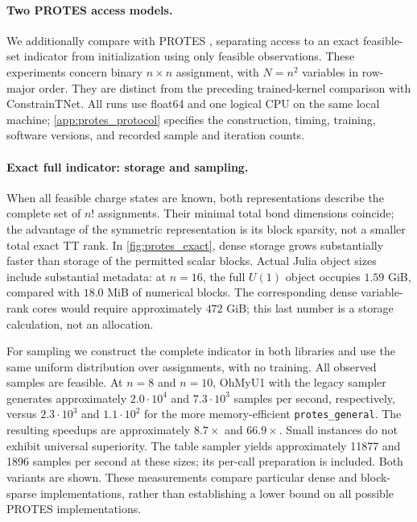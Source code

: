 \paragraph{Two PROTES access models.}
We additionally compare with PROTES \cite{batsheva2023protes}, separating
access to an exact feasible-set indicator from initialization using only
feasible observations. These experiments concern binary $n\times n$
assignment, with $N=n^2$ variables in row-major order. They are distinct from
the preceding trained-kernel comparison with ConstrainTNet.
All runs use float64 and one logical CPU on the same local machine;
\cref{app:protes_protocol} specifies the construction, timing, training,
software versions, and recorded sample and iteration counts.

\paragraph{Exact full indicator: storage and sampling.}
When all feasible charge states are known, both representations describe
the complete set of $n!$ assignments. Their minimal total bond dimensions
coincide; the advantage of the symmetric representation is its block sparsity,
not a smaller total exact TT rank. In \cref{fig:protes_exact}, dense storage
grows substantially faster than storage of the permitted scalar blocks.
Actual Julia object sizes include substantial metadata: at $n=16$, the full
$U(1)$ object occupies $1.59$ GiB, compared with $18.0$ MiB of numerical blocks.
The corresponding dense variable-rank cores would require approximately
$472$ GiB; this last number is a storage calculation, not an allocation.

For sampling we construct the complete indicator in both libraries and
use the same uniform distribution over assignments, with no training.
All observed samples are feasible. At $n=8$ and $n=10$, OhMyU1 with the legacy sampler generates
approximately $2.0\cdot10^{4}$ and $7.3\cdot10^{3}$ samples per second,
respectively, versus $2.3\cdot10^{3}$ and $1.1\cdot10^{2}$ for the more
memory-efficient \texttt{protes\_general}. The resulting speedups are
approximately $8.7\times$ and $66.9\times$.
Small instances do not exhibit universal superiority.
The table sampler yields approximately 11877 and 1896 samples per second at these sizes; its per-call preparation is included. Both variants are shown.
 These measurements compare particular dense and
block-sparse implementations, rather than establishing a lower bound on
all possible PROTES implementations.

